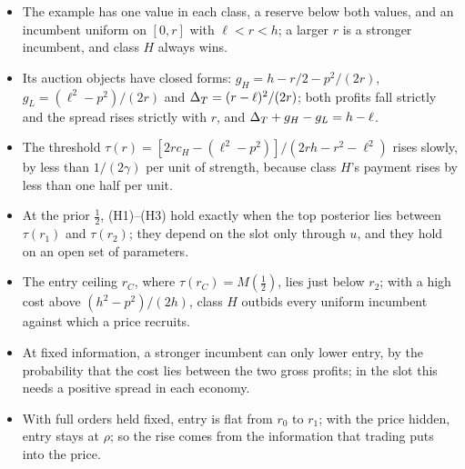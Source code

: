 \begin{chaptersummary}
\begin{itemize}
\item The example has one value in each class, a reserve below both values, and an incumbent uniform on \([0,r]\)
  with \(\ell<r<h\); a larger \(r\) is a stronger incumbent, and class \(H\) always wins.
\item Its auction objects have closed forms: \(g_H=h-r/2-p^2/(2r)\), \(g_L=(\ell^2-p^2)/(2r)\) and
  \(\Delta_T=(r-\ell)^2/(2r)\); both profits fall strictly and the spread rises strictly with \(r\), and
  \(\Delta_T+g_H-g_L=h-\ell\).
\item The threshold \(\tau(r)=[2rc_H-(\ell^2-p^2)]/(2rh-r^2-\ell^2)\) rises slowly, by less than \(1/(2\gamma)\) per unit
  of strength, because class \(H\)'s payment rises by less than one half per unit.
\item At the prior \(\tfrac12\), (H1)--(H3) hold exactly when the top posterior lies between \(\tau(r_1)\) and
  \(\tau(r_2)\); they depend on the slot only through \(u\), and they hold on an open set of parameters.
\item The entry ceiling \(r_C\), where \(\tau(r_C)=M(\tfrac12)\), lies just below \(r_2\); with a high cost above
  \((h^2-p^2)/(2h)\), class \(H\) outbids every uniform incumbent against which a price recruits.
\item At fixed information, a stronger incumbent can only lower entry, by the probability that the cost lies between
  the two gross profits; in the slot this needs a positive spread in each economy.
\item With full orders held fixed, entry is flat from \(r_0\) to \(r_1\); with the price hidden, entry stays at
  \(\rho\); so the rise comes from the information that trading puts into the price.
\end{itemize}
\end{chaptersummary}

\answersection


